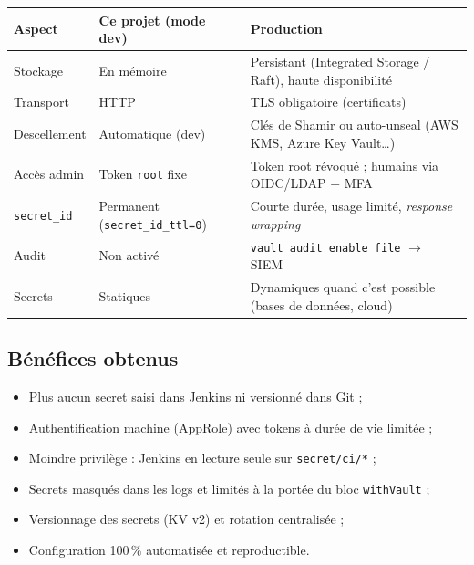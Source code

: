 \documentclass[11pt,a4paper]{article}
\newcommand{\vpath}[1]{\texttt{#1}}
\begin{document}
\begin{center}
\begin{tabularx}{\linewidth}{>{\raggedright\arraybackslash}p{3.3cm} X X}
\toprule
\textbf{Aspect} & \textbf{Ce projet (mode dev)} & \textbf{Production} \\
\midrule
Stockage        & En mémoire                      & Persistant (Integrated Storage / Raft), haute disponibilité \\
Transport       & HTTP                            & TLS obligatoire (certificats) \\
Descellement    & Automatique (dev)               & Clés de Shamir ou auto-unseal (AWS KMS, Azure Key Vault\ldots) \\
Accès admin     & Token \texttt{root} fixe        & Token root révoqué ; humains via OIDC/LDAP + MFA \\
\texttt{secret\_id} & Permanent (\texttt{secret\_id\_ttl=0}) & Courte durée, usage limité, \emph{response wrapping} \\
Audit           & Non activé                      & \texttt{vault audit enable file} $\rightarrow$ SIEM \\
Secrets         & Statiques                       & Dynamiques quand c'est possible (bases de données, cloud) \\
\bottomrule
\end{tabularx}
\end{center}

\subsection{Bénéfices obtenus}

\begin{itemize}[leftmargin=*]
  \item[\textcolor{okgreen}{\checkmark}] Plus aucun secret saisi dans Jenkins ni versionné dans Git ;
  \item[\textcolor{okgreen}{\checkmark}] Authentification machine (AppRole) avec tokens à durée de vie limitée ;
  \item[\textcolor{okgreen}{\checkmark}] Moindre privilège : Jenkins en lecture seule sur \vpath{secret/ci/*} ;
  \item[\textcolor{okgreen}{\checkmark}] Secrets masqués dans les logs et limités à la portée du bloc \texttt{withVault} ;
  \item[\textcolor{okgreen}{\checkmark}] Versionnage des secrets (KV v2) et rotation centralisée ;
  \item[\textcolor{okgreen}{\checkmark}] Configuration 100\,\% automatisée et reproductible.
\end{itemize}
\end{document}
